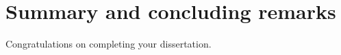 \chapter{Summary and concluding remarks}\label{CH_summary}

Congratulations on completing your dissertation.
